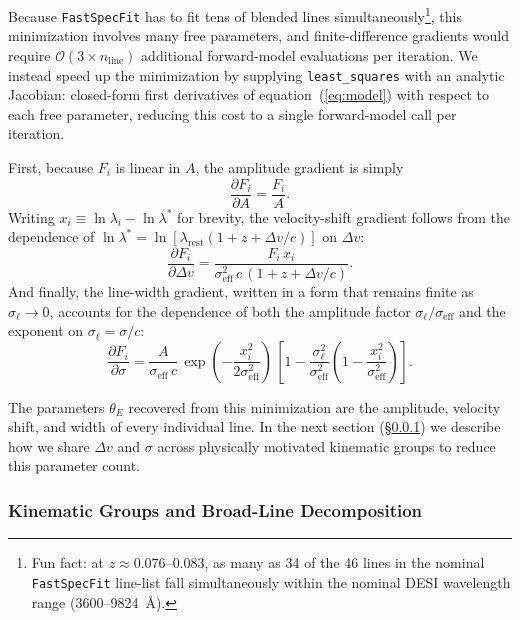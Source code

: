 \documentclass[modern,linenumbers]{aastex702}
\newcommand{\fastspecfit}{\texttt{FastSpecFit}}
\begin{document}
Because \fastspecfit{} has to fit tens of blended lines
simultaneously\footnote{Fun fact: at $z \approx 0.076$–$0.083$, as
many as 34 of the 46 lines in the nominal \fastspecfit{} line-list
fall simultaneously within the nominal DESI wavelength range
(3600–9824~\AA).}, this minimization involves many free parameters,
and finite-difference gradients would require $\mathcal{O}(3\times
n_\mathrm{line})$ additional forward-model evaluations per
iteration. We instead speed up the minimization by supplying
\texttt{least\_squares} with an analytic Jacobian: closed-form first
derivatives of equation~(\ref{eq:model}) with respect to each free
parameter, reducing this cost to a single forward-model call per
iteration.

First, because $F_i$ is linear in $A$, the amplitude gradient is
simply
\begin{equation}
  \frac{\partial F_i}{\partial A} = \frac{F_i}{A}.
  \label{eq:dF_dA}
\end{equation}
Writing $x_i \equiv \ln\lambda_i - \ln\lambda^*$ for brevity, the
velocity-shift gradient follows from the dependence of
$\ln\lambda^* = \ln[\lambda_\mathrm{rest}(1 + z + \Delta v/c)]$ on
$\Delta v$:
\begin{equation}
  \frac{\partial F_i}{\partial \Delta v}
  =
  \frac{F_i\,x_i}{\sigma_\mathrm{eff}^2\,c\,(1+z+\Delta v/c)}.
  \label{eq:dF_dv}
\end{equation}
And finally, the line-width gradient, written in a form that remains
finite as $\sigma_\ell\to0$, accounts for the dependence of both the
amplitude factor $\sigma_\ell/\sigma_\mathrm{eff}$ and the exponent on
$\sigma_\ell = \sigma/c$:
\begin{equation}
  \frac{\partial F_i}{\partial \sigma} =
  \frac{A}{\sigma_\mathrm{eff}\,c}\,
  \exp\!\left(-\frac{x_i^2}{2\sigma_\mathrm{eff}^2} \right) \, \left[1
    - \frac{\sigma_\ell^2}{\sigma_\mathrm{eff}^2} \left(1 -
    \frac{x_i^2}{\sigma_\mathrm{eff}^2} \right)\right].
  \label{eq:dF_ds}
\end{equation}

The parameters $\theta_E$ recovered from this minimization are the
amplitude, velocity shift, and width of every individual line. In the
next section (\S\ref{sssec:kinematic}) we describe how we share
$\Delta v$ and $\sigma$ across physically motivated kinematic groups
to reduce this parameter count.

\subsubsection{Kinematic Groups and Broad-Line Decomposition}
\label{sssec:kinematic}
\end{document}
